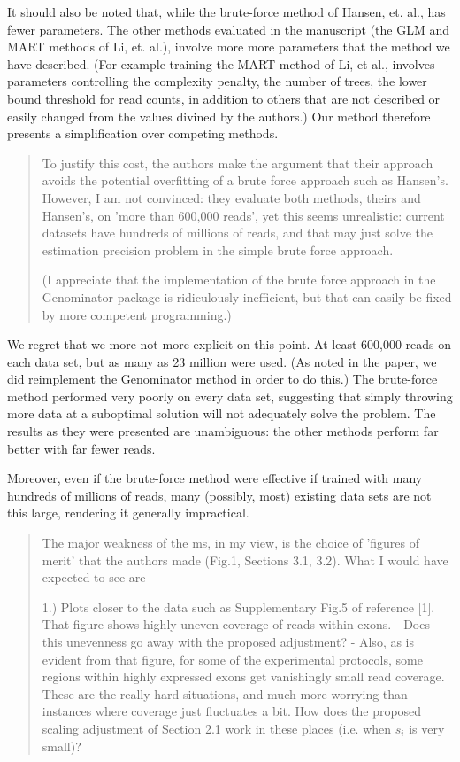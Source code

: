 \documentclass{article}
\begin{document}
It should also be noted that, while the brute-force method of Hansen, et. al.,
has fewer parameters. The other methods evaluated in the manuscript (the GLM and
MART methods of Li, et. al.), involve more more parameters that the method we
have described. (For example training the MART method of Li, et al., involves
parameters controlling the complexity penalty, the number of trees, the lower
bound threshold for read counts, in addition to others that are not described or
easily changed from the values divined by the authors.) Our method therefore
presents a simplification over competing methods.


\begin{quote}
To justify this cost, the
authors make the argument that their approach avoids the potential
overfitting of a brute force approach such as Hansen's. However, I am
not convinced: they evaluate both methods, theirs and Hansen's, on
'more than 600,000 reads', yet this seems unrealistic: current
datasets have hundreds of millions of reads, and that may just solve
the estimation precision problem in the simple brute force approach.

(I appreciate that the implementation of the brute force approach in
the Genominator package is ridiculously inefficient, but that can
easily be fixed by more competent programming.)
\end{quote}

We regret that we more not more explicit on this point. At least 600,000 reads
on each data set, but as many as 23 million were used. (As noted in the paper,
we did reimplement the Genominator method in order to do this.) The brute-force
method performed very poorly on every data set, suggesting that simply throwing
more data at a suboptimal solution will not adequately solve the problem. The
results as they were presented are unambiguous: the other methods perform far
better with far fewer reads.

Moreover, even if the brute-force method were effective if trained with many
hundreds of millions of reads, many (possibly, most) existing data sets are not
this large, rendering it generally impractical.


\begin{quote}
The major weakness of the ms, in my view, is the choice of 'figures of
merit' that the authors made (Fig.1, Sections 3.1, 3.2). What I would
have expected to see are

1.) Plots closer to the data such as Supplementary Fig.5 of
reference [1]. That figure shows highly uneven coverage of reads
within exons.
- Does this unevenness go away with the proposed adjustment?
- Also, as is evident from that figure, for some of the experimental
protocols, some regions within highly expressed exons get vanishingly
small read coverage.  These are the really hard situations, and much
more worrying than instances where coverage just fluctuates a bit.
How does the proposed scaling adjustment of Section 2.1 work in these
places (i.e. when $s_{i}$ is very small)?
\end{quote}
\end{document}

